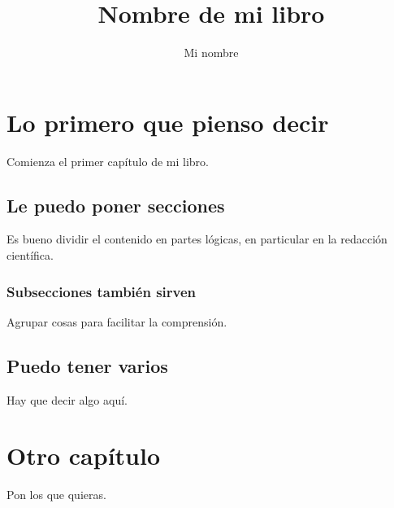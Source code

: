 \documentclass{book}
\title{Nombre de mi libro}
\author{Mi nombre}
\begin{document}
\maketitle

\tableofcontents

\chapter{Lo primero que pienso decir}

Comienza el primer capítulo de mi libro.

\section{Le puedo poner secciones}

Es bueno dividir el contenido en partes lógicas, en particular en la redacción científica.

\subsection{Subsecciones también sirven}

Agrupar cosas para facilitar la comprensión.

\section{Puedo tener varios}

Hay que decir algo aquí.

\chapter{Otro capítulo}

Pon los que quieras.
\end{document}
